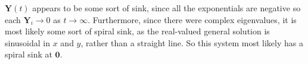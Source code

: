 \documentclass[11pt, letterpaper]{report}
\begin{document}
$\mathbf{Y}(t)$ appears to be some sort of sink, since all the exponentials are negative so each $\mathbf{Y}_i\to 0$ as $t\to \infty$. Furthermore, since there were complex eigenvalues, it is most likely some sort of spiral sink, as the real-valued general solution is sinusoidal in $x$ and $y$, rather than a straight line. So this system most likely has a spiral sink at $\mathbf{0}$.
\end{document}

